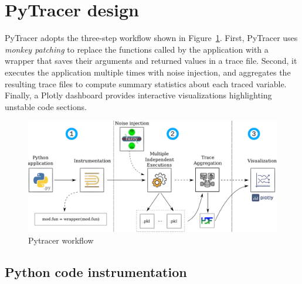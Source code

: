 \documentclass[10pt,journal,compsoc]{IEEEtran}
\newcommand{\pytracer}[0]{PyTracer\xspace}
\begin{document}
\section{\pytracer design}

\pytracer adopts the three-step workflow shown in Figure~\ref{fig:workflow}.
First, \pytracer uses \textit{monkey patching} to replace the functions called
by the application with a wrapper that saves their arguments and returned values
in a trace file.
Second, it executes the application multiple times with noise injection, and
aggregates the resulting trace files to compute summary statistics about each
traced variable. Finally, a Plotly dashboard provides interactive visualizations
highlighting unstable code sections.


\begin{figure}
    \centering
    \includegraphics[width=0.75\linewidth]{figure/workflow.pdf}
    \caption{Pytracer workflow
    }
    \label{fig:workflow}
\end{figure}

\subsection{Python code instrumentation}

\end{document}
